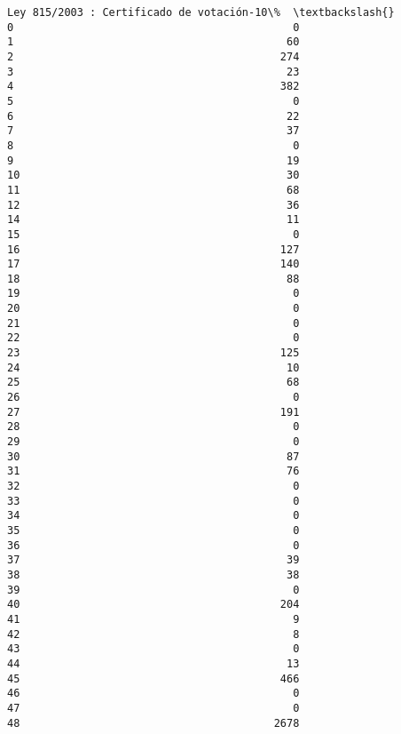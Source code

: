 \documentclass[11pt]{article}
\begin{document}
\begin{Verbatim}[commandchars=\\\{\}]
    Ley 815/2003 : Certificado de votación-10\%  \textbackslash{}
0                                            0   
1                                           60   
2                                          274   
3                                           23   
4                                          382   
5                                            0   
6                                           22   
7                                           37   
8                                            0   
9                                           19   
10                                          30   
11                                          68   
12                                          36   
14                                          11   
15                                           0   
16                                         127   
17                                         140   
18                                          88   
19                                           0   
20                                           0   
21                                           0   
22                                           0   
23                                         125   
24                                          10   
25                                          68   
26                                           0   
27                                         191   
28                                           0   
29                                           0   
30                                          87   
31                                          76   
32                                           0   
33                                           0   
34                                           0   
35                                           0   
36                                           0   
37                                          39   
38                                          38   
39                                           0   
40                                         204   
41                                           9   
42                                           8   
43                                           0   
44                                          13   
45                                         466   
46                                           0   
47                                           0   
48                                        2678   


\end{Verbatim}
\end{document}
